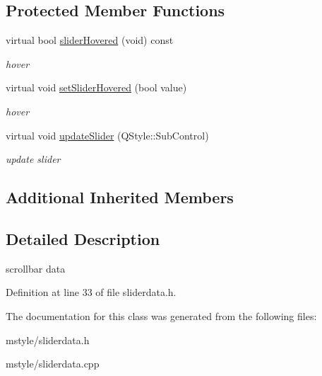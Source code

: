 \subsection*{Protected Member Functions}
\begin{DoxyCompactItemize}
\item 
\mbox{\label{class_slider_data_ad17ff86ca3e17d7e24ad860248b78389}} 
virtual bool \hyperlink{class_slider_data_ad17ff86ca3e17d7e24ad860248b78389}{slider\+Hovered} (void) const
\begin{DoxyCompactList}\small\item\em hover \end{DoxyCompactList}\item 
\mbox{\label{class_slider_data_adce322afeb5f21ea00f676ef1290bd21}} 
virtual void \hyperlink{class_slider_data_adce322afeb5f21ea00f676ef1290bd21}{set\+Slider\+Hovered} (bool value)
\begin{DoxyCompactList}\small\item\em hover \end{DoxyCompactList}\item 
\mbox{\label{class_slider_data_aecb664f7a3beddbb8d518485c8fc66c2}} 
virtual void \hyperlink{class_slider_data_aecb664f7a3beddbb8d518485c8fc66c2}{update\+Slider} (Q\+Style\+::\+Sub\+Control)
\begin{DoxyCompactList}\small\item\em update slider \end{DoxyCompactList}\end{DoxyCompactItemize}
\subsection*{Additional Inherited Members}


\subsection{Detailed Description}
scrollbar data 

Definition at line 33 of file sliderdata.\+h.



The documentation for this class was generated from the following files\+:\begin{DoxyCompactItemize}
\item 
mstyle/sliderdata.\+h\item 
mstyle/sliderdata.\+cpp\end{DoxyCompactItemize}

